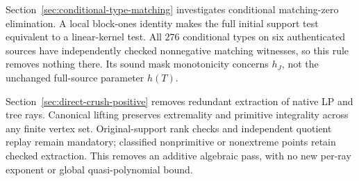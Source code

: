 \documentclass[11pt]{article}
\theoremstyle{remark}
\begin{document}
Section~\ref{sec:conditional-type-matching} investigates conditional
matching-zero elimination.  A local block-ones identity makes the full
initial support test equivalent to a linear-kernel test.  All $276$
conditional types on six authenticated sources have independently
checked nonnegative matching witnesses, so this rule removes nothing
there.  Its sound mask monotonicity concerns $h_J$, not the unchanged
full-source parameter $h(T)$.

Section~\ref{sec:direct-crush-positive} removes redundant extraction of
native LP and tree rays.  Canonical lifting preserves extremality and
primitive integrality across any finite vertex set.  Original-support
rank checks and independent quotient replay remain mandatory; classified
nonprimitive or nonextreme points retain checked extraction.  This removes
an additive algebraic pass, with no new per-ray exponent or global
quasi-polynomial bound.
\end{document}
